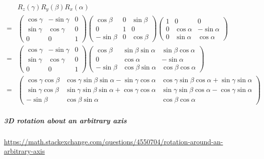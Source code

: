 \documentclass[
]{book}
\theoremstyle{definition}
\theoremstyle{definition}
\theoremstyle{definition}
\theoremstyle{definition}
\theoremstyle{remark}
\begin{document}
\[
\begin{aligned}
 & R_{{\scriptscriptstyle z}}\left(\gamma\right)R_{{\scriptscriptstyle y}}\left(\beta\right)R_{{\scriptscriptstyle x}}\left(\alpha\right)\\
= & \begin{pmatrix}\cos\gamma & -\sin\gamma & 0\\
\sin\gamma & \cos\gamma & 0\\
0 & 0 & 1
\end{pmatrix}\begin{pmatrix}\cos\beta & 0 & \sin\beta\\
0 & 1 & 0\\
-\sin\beta & 0 & \cos\beta
\end{pmatrix}\begin{pmatrix}1 & 0 & 0\\
0 & \cos\alpha & -\sin\alpha\\
0 & \sin\alpha & \cos\alpha
\end{pmatrix}\\
= & \begin{pmatrix}\cos\gamma & -\sin\gamma & 0\\
\sin\gamma & \cos\gamma & 0\\
0 & 0 & 1
\end{pmatrix}\begin{pmatrix}\cos\beta & \sin\beta\sin\alpha & \sin\beta\cos\alpha\\
0 & \cos\alpha & -\sin\alpha\\
-\sin\beta & \cos\beta\sin\alpha & \cos\beta\cos\alpha
\end{pmatrix}\\
= & \begin{pmatrix}\cos\gamma\cos\beta & \cos\gamma\sin\beta\sin\alpha-\sin\gamma\cos\alpha & \cos\gamma\sin\beta\cos\alpha+\sin\gamma\sin\alpha\\
\sin\gamma\cos\beta & \sin\gamma\sin\beta\sin\alpha+\cos\gamma\cos\alpha & \sin\gamma\sin\beta\cos\alpha-\cos\gamma\sin\alpha\\
-\sin\beta & \cos\beta\sin\alpha & \cos\beta\cos\alpha
\end{pmatrix}
\end{aligned}
\]

\hypertarget{d-rotation-about-an-arbitrary-axis}{%
\subparagraph{3D rotation about an arbitrary axis}\label{d-rotation-about-an-arbitrary-axis}}

\url{https://math.stackexchange.com/questions/4550704/rotation-around-an-arbitrary-axis}
\end{document}
